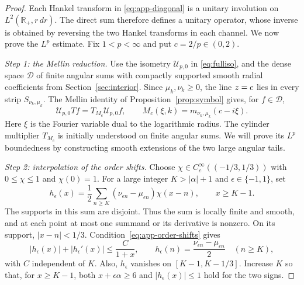 \documentclass[11pt,a4paper,reqno,backref=page]{amsart}
\newcommand{\R}{\mathbb R}
\let\Re\relax\DeclareMathOperator{\Re}{Re}
\numberwithin{equation}{section}
\theoremstyle{definition}
\theoremstyle{remark}
\begin{document}
\begin{proof}
  Each Hankel transform in \eqref{eq:app-diagonal} is a
  unitary involution on $L^2(\R_+,r\,dr)$. The direct sum
  therefore defines a unitary operator, whose inverse is
  obtained by reversing the two Hankel transforms in each
  channel. We now prove the $L^p$ estimate. Fix
  $1<p<\infty$ and put $c=2/p\in(0,2)$.

  \emph{Step 1: the Mellin reduction.}
  Use the isometry $\mathcal U_{p,0}$ in
  \eqref{eq:fulliso}, and the dense space $\mathcal D$
  of finite angular sums with compactly supported smooth
  radial coefficients from Section~\ref{sec:interior}.
  Since $\mu_k,\nu_k\ge0$, the line $\Re z=c$ lies in
  every strip $S_{\nu_k,\mu_k}$. The Mellin identity of
  Proposition~\ref{prop:symbol} gives, for $f\in\mathcal D$,
  \begin{equation}\label{eq:app-conjugation}
    \mathcal U_{p,0}Tf=T_{M_c}\mathcal U_{p,0}f,
    \qquad M_c(\xi,k)=m_{\nu_k,\mu_k}(c-i\xi).
  \end{equation}
  Here $\xi$ is the Fourier variable dual to the logarithmic
  radius. The cylinder multiplier $T_{M_c}$ is initially
  understood on finite angular sums.
  We will prove its $L^p$ boundedness by constructing smooth
  extensions of the two large angular tails.

  \emph{Step 2: interpolation of the order shifts.}
  Choose $\chi\in C_c^\infty((-1/3,1/3))$ with
  $0\le\chi\le1$ and $\chi(0)=1$. For a large integer
  $K>|\alpha|+1$ and $\epsilon\in\{-1,1\}$, set
  \begin{equation}\label{eq:app-interpolation}
    h_\epsilon(x)=\frac12\sum_{n\ge K}
    (\nu_{\epsilon n}-\mu_{\epsilon n})\chi(x-n),
    \qquad x\ge K-1.
  \end{equation}
  The supports in this sum are disjoint. Thus the sum is
  locally finite and smooth, and at each point at most one
  summand or its derivative is nonzero. On its support,
  $|x-n|<1/3$. Condition~\eqref{eq:app-order-shifts} gives
  \begin{equation}\label{eq:app-interpolation-bounds}
    |h_\epsilon(x)|+|h_\epsilon'(x)|
    \le\frac{C}{1+x},\qquad
    h_\epsilon(n)=\frac{\nu_{\epsilon n}
      -\mu_{\epsilon n}}2\quad(n\ge K),
  \end{equation}
  with $C$ independent of $K$. Also, $h_\epsilon$ vanishes
  on $[K-1,K-1/3]$. Increase $K$ so that, for $x\ge K-1$,
  both $x+\epsilon\alpha\ge6$ and
  $|h_\epsilon(x)|\le1$ hold for the two signs.


\end{proof}
\end{document}
